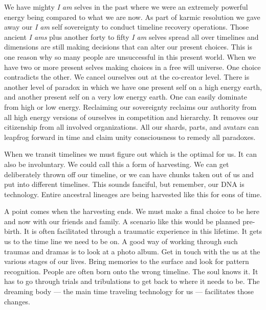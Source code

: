 We have mighty \emph{I am} selves in the past where we were an extremely
powerful energy being compared to what we are now. As part of karmic
resolution we gave away our \emph{I am} self sovereignty to conduct
timeline recovery operations. Those ancient \emph{I ams} plus another
forty to fifty \emph{I am} selves spread all over timelines and
dimensions are still making decisions that can alter our present
choices. This is one reason why so many people are unsuccessful in this
present world. When we have two or more present selves making choices in
a free will universe. One choice contradicts the other. We cancel
ourselves out at the co-creator level. There is another level of paradox
in which we have one present self on a high energy earth, and another
present self on a very low energy earth. One can easily dominate from
high or low energy. Reclaiming our sovereignty reclaims our authority
from all high energy versions of ourselves in competition and hierarchy.
It removes our citizenship from all involved organizations. All our
shards, parts, and avatars can leapfrog forward in time and claim unity
consciousness to remedy all paradoxes.

When we transit timelines we must figure out which is the optimal for
us. It can also be involuntary. We could call this a form of harvesting.
We can get deliberately thrown off our timeline, or we can have chunks
taken out of us and put into different timelines. This sounds fanciful,
but remember, our DNA is technology. Entire ancestral lineages are being
harvested like this for eons of time.

A point comes when the harvesting ends. We must make a final choice to
be here and now with our friends and family. A scenario like this would
be planned pre-birth. It is often facilitated through a traumatic
experience in this lifetime. It gets us to the time line we need to be
on. A good way of working through such traumas and dramas is to look at
a photo album. Get in touch with the us at the various stages of our
lives. Bring memories to the surface and look for pattern recognition.
People are often born onto the wrong timeline. The soul knows it. It has
to go through trials and tribulations to get back to where it needs to
be. The dreaming body --- the main time traveling technology for us ---
facilitates those changes.

